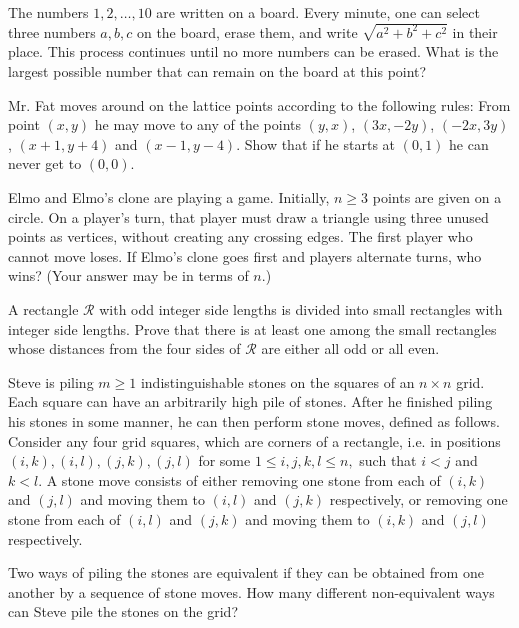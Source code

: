 \documentclass[mast]{lucky}
\begin{document}
\begin{prob}{3}
The numbers $1, 2,\ldots , 10$ are written on a board. Every minute, one can select three numbers $a, b, c$ on the board, erase them, and write $\sqrt{a^{2}+b^{2}+c^{2}}$ in their place. This process continues until no more numbers can be erased. What is the largest possible number that can remain on the board at this point?
\end{prob}


\begin{prob}[ELMO 1999/2]{3}
Mr. Fat moves around on the lattice points according to the following rules: From point $(x,y)$ he may move to any of the points $(y,x)$, $(3x,-2y)$, $(-2x,3y)$, $(x+1,y+4)$ and $(x-1,y-4)$. Show that if he starts at $(0,1)$ he can never get to $(0,0)$.
\end{prob}


\begin{req}[ELMO SL 2019/C1]{3}
Elmo and Elmo's clone are playing a game. Initially, $n\geq 3$ points are given on a circle. On a player's turn, that player must draw a triangle using three unused points as vertices, without creating any crossing edges. The first player who cannot move loses. If Elmo's clone goes first and players alternate turns, who wins? (Your answer may be in terms of $n$.)
\end{req}


\begin{prob}[ISL 2017/C1]{6}
A rectangle $\mathcal{R}$ with odd integer side lengths is divided into small rectangles with integer side lengths. Prove that there is at least one among the small rectangles whose distances from the four sides of $\mathcal{R}$ are either all odd or all even.
\end{prob}

\begin{prob}[USAMO 2015/4]{13}
Steve is piling $m \geq 1$ indistinguishable stones on the squares of an $n \times n$ grid. Each square can have an arbitrarily high pile of stones. After he finished piling his stones in some manner, he can then perform stone moves, defined as follows. Consider any four grid squares, which are corners of a rectangle, i.e. in positions $(i, k),(i, l),(j, k),(j, l)$ for some $1 \leq i, j, k, l \leq n,$ such that $i<j$ and $k<l .$ A stone move consists of either removing one stone from each of $(i, k)$ and $(j, l)$ and moving them to $(i, l)$ and $(j, k)$ respectively, or removing one stone from each of $(i, l)$ and $(j, k)$ and moving them to $(i, k)$ and $(j, l)$ respectively.

Two ways of piling the stones are equivalent if they can be obtained from one another by a sequence of stone moves. How many different non-equivalent ways can Steve pile the stones on the grid?
\end{prob} 
\end{document}
